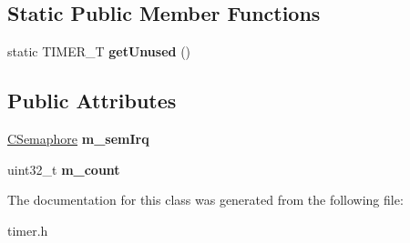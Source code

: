 \subsection*{Static Public Member Functions}
\begin{DoxyCompactItemize}
\item 
\hypertarget{class_c_timer_a2021fd4d79d43498822c376625dd511b}{static T\-I\-M\-E\-R\-\_\-\-T {\bfseries get\-Unused} ()}\label{class_c_timer_a2021fd4d79d43498822c376625dd511b}

\end{DoxyCompactItemize}
\subsection*{Public Attributes}
\begin{DoxyCompactItemize}
\item 
\hypertarget{class_c_timer_a1bd7d3dbb8bfeeb5e603a7f7c0eed5c7}{\hyperlink{class_c_semaphore}{C\-Semaphore} {\bfseries m\-\_\-sem\-Irq}}\label{class_c_timer_a1bd7d3dbb8bfeeb5e603a7f7c0eed5c7}

\item 
\hypertarget{class_c_timer_a0ab331eadfa7223dfe9344db39dac615}{uint32\-\_\-t {\bfseries m\-\_\-count}}\label{class_c_timer_a0ab331eadfa7223dfe9344db39dac615}

\end{DoxyCompactItemize}


The documentation for this class was generated from the following file\-:\begin{DoxyCompactItemize}
\item 
timer.\-h\end{DoxyCompactItemize}
